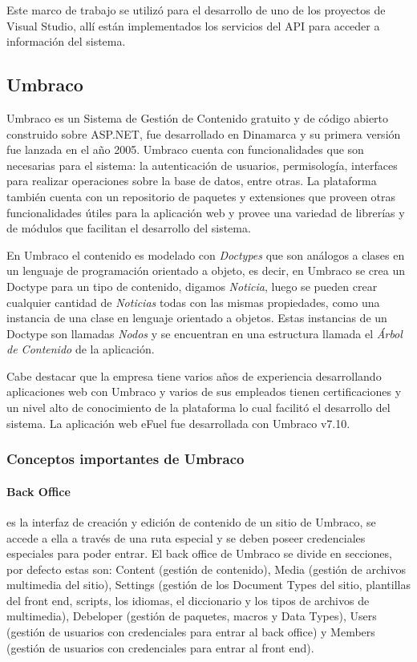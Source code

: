     Este marco de trabajo se utilizó para el desarrollo de uno de los proyectos de Visual Studio, allí están implementados los servicios del API para acceder a información del sistema.

    \subsection{Umbraco}
    Umbraco es un Sistema de Gestión de Contenido gratuito y de código abierto construido sobre ASP.NET, fue desarrollado en Dinamarca y su primera versión fue lanzada en el año 2005. Umbraco cuenta con funcionalidades que son necesarias para el sistema: la autenticación de usuarios, permisología, interfaces para realizar operaciones sobre la base de datos, entre otras. La plataforma también cuenta con un repositorio de paquetes y extensiones que proveen otras funcionalidades útiles para la aplicación web y provee una variedad de librerías y de módulos que facilitan el desarrollo del sistema.

    En Umbraco el contenido es modelado con \emph{Doctypes} que son análogos a clases en un lenguaje de programación orientado a objeto, es decir, en Umbraco se crea un Doctype para un tipo de contenido, digamos \emph{Noticia}, luego se pueden crear cualquier cantidad de \emph{Noticias} todas con las mismas propiedades, como una instancia de una clase en lenguaje orientado a objetos. Estas instancias de un Doctype son llamadas \emph{Nodos} y se encuentran en una estructura llamada el \emph{Árbol de Contenido} de la aplicación.

    Cabe destacar que la empresa tiene varios años de experiencia desarrollando aplicaciones web con Umbraco y varios de sus empleados tienen certificaciones y un nivel alto de conocimiento de la plataforma lo cual facilitó el desarrollo del sistema. La aplicación web eFuel fue desarrollada con Umbraco v7.10.

    \subsubsection{Conceptos importantes de Umbraco}
    \paragraph{Back Office} es la interfaz de creación y edición de contenido de un sitio de Umbraco, se accede a ella a través de una ruta especial y se deben poseer credenciales especiales para poder entrar. El back office de Umbraco se divide en secciones, por defecto estas son: Content (gestión de contenido), Media (gestión de archivos multimedia del sitio), Settings (gestión de los Document Types del sitio, plantillas del front end, scripts, los idiomas, el diccionario y los tipos de archivos de multimedia), Debeloper (gestión de paquetes, macros y Data Types), Users (gestión de usuarios con credenciales para entrar al back office) y Members (gestión de usuarios con credenciales para entrar al front end).
